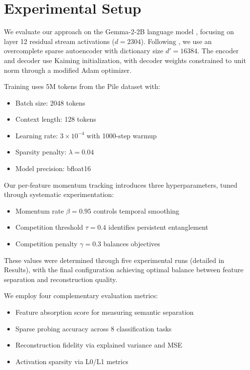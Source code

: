 \documentclass{article} %
\begin{document}
\section{Experimental Setup}
\label{sec:experimental}

We evaluate our approach on the Gemma-2-2B language model \cite{gaoScalingEvaluatingSparse}, focusing on layer 12 residual stream activations ($d=2304$). Following \cite{mudideEfficientDictionaryLearning2024a}, we use an overcomplete sparse autoencoder with dictionary size $d'=16384$. The encoder and decoder use Kaiming initialization, with decoder weights constrained to unit norm through a modified Adam optimizer.

Training uses 5M tokens from the Pile dataset with:
\begin{itemize}
    \item Batch size: 2048 tokens
    \item Context length: 128 tokens
    \item Learning rate: $3\times10^{-4}$ with 1000-step warmup
    \item Sparsity penalty: $\lambda=0.04$
    \item Model precision: bfloat16
\end{itemize}

Our per-feature momentum tracking introduces three hyperparameters, tuned through systematic experimentation:
\begin{itemize}
    \item Momentum rate $\beta=0.95$ controls temporal smoothing
    \item Competition threshold $\tau=0.4$ identifies persistent entanglement
    \item Competition penalty $\gamma=0.3$ balances objectives
\end{itemize}
These values were determined through five experimental runs (detailed in Results), with the final configuration achieving optimal balance between feature separation and reconstruction quality.

We employ four complementary evaluation metrics:
\begin{itemize}
    \item Feature absorption score \cite{chaninAbsorptionStudyingFeature2024} for measuring semantic separation
    \item Sparse probing accuracy \cite{gurneeFindingNeuronsHaystack2023} across 8 classification tasks
    \item Reconstruction fidelity via explained variance and MSE
    \item Activation sparsity via L0/L1 metrics
\end{itemize}
\end{document}
